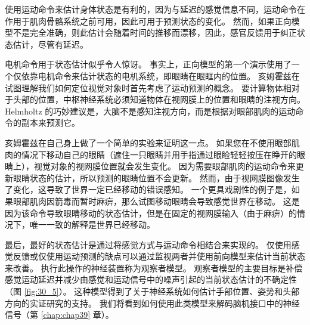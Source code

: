 使用运动命令来估计身体状态是有利的，因为与延迟的感觉信息不同，运动命令在作用于肌肉骨骼系统之前可用，因此可用于预测状态的变化。
然而，如果正向模型不是完全准确，则此估计会随着时间的推移而漂移，因此，感官反馈用于纠正状态估计，尽管有延迟。


电机命令用于状态估计似乎令人惊讶。
事实上，正向模型的第一个演示使用了一个仅依靠电机命令来估计状态的电机系统，即眼睛在眼眶内的位置。
亥姆霍兹在试图理解我们如何定位视觉对象时首先考虑了运动预测的概念。
要计算物体相对于头部的位置，中枢神经系统必须知道物体在视网膜上的位置和眼睛的注视方向。
Helmholtz 的巧妙建议是，大脑不是感知注视方向，而是根据对眼部肌肉的运动命令的副本来预测它。


亥姆霍兹在自己身上做了一个简单的实验来证明这一点。 如果您在不使用眼部肌肉的情况下移动自己的眼睛（遮住一只眼睛并用手指通过眼睑轻轻按压在睁开的眼睛上），视觉对象的视网膜位置就会发生变化。
因为需要眼部肌肉的运动命令来更新眼睛状态的估计，所以预测的眼睛位置不会更新。
然而，由于视网膜图像发生了变化，这导致了世界一定已经移动的错误感知。
一个更具戏剧性的例子是，如果眼部肌肉因箭毒而暂时麻痹，那么试图移动眼睛会导致感觉世界在移动。
这是因为该命令导致眼睛移动的状态估计，但是在固定的视网膜输入（由于麻痹）的情况下，唯一一致的解释是世界已经移动。


最后，最好的状态估计是通过将感觉方式与运动命令相结合来实现的。
仅使用感觉反馈或仅使用运动预测的缺点可以通过监视两者并使用前向模型来估计当前状态来改善。
执行此操作的神经装置称为观察者模型。 
观察者模型的主要目标是补偿感觉运动延迟并减少由感觉和运动信号中的噪声引起的当前状态估计的不确定性（图 \ref{fig:30_5}）。 
这种模型得到了关于神经系统如何估计手部位置、姿势和头部方向的实证研究的支持。
我们将看到如何使用此类模型来解码脑机接口中的神经信号（第 \ref{chap:chap39} 章）。


